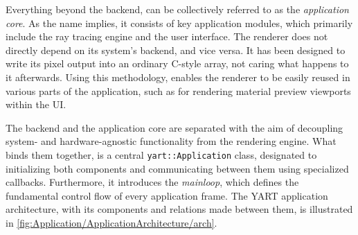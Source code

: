 Everything beyond the backend, can be collectively referred to as the \textit{application core}. 
As the name implies, it consists of key application modules, which primarily include the ray tracing engine and the user interface.
The renderer does not directly depend on its system's backend, and vice versa. 
It has been designed to write its pixel output into an ordinary C-style array, not caring what happens to it afterwards.
Using this methodology, enables the renderer to be easily reused in various parts of the application, such as for rendering material preview viewports within the UI.

The backend and the application core are separated with the aim of decoupling system- and hardware-agnostic functionality from the rendering engine.
What binds them together, is a central \verb|yart::Application| class, designated to initializing both components and communicating between them using specialized callbacks. 
Furthermore, it introduces the \textit{mainloop}, which defines the fundamental control flow of every application frame.
The YART application architecture, with its components and relations made between them, is illustrated in \cref{fig:Application/ApplicationArchitecture/arch}. 

